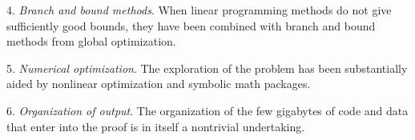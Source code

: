 4. {\it Branch and bound methods}.  When linear programming methods do not
    give sufficiently good bounds, they have been combined with branch
    and bound methods from global optimization.

5.  {\it Numerical optimization}.  The exploration of the problem
    has been substantially
    aided by nonlinear optimization and symbolic math packages.

6. {\it Organization of output}.
    The organization of the few gigabytes of code and data that
    enter into the proof is in itself a nontrivial undertaking.


















